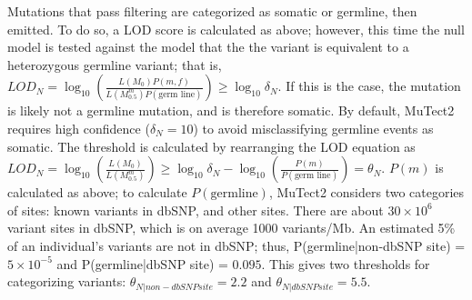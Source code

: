 Mutations that pass filtering are categorized as somatic or germline, then emitted. To do so, a LOD score is calculated as above; however, this time the null model is tested against the model that the the variant is equivalent to a heterozygous germline variant; that is, $LOD_N=\log_{10} \left(\frac{L(M_0)P(m,f)}{L(M_{0.5}^m)P(\text{germ line})}\right) \geq \log_{10} \delta{}_N$. If this is the case, the mutation is likely not a germline mutation, and is therefore somatic. By default, MuTect2 requires high confidence ($\delta{}_N = 10$) to avoid misclassifying germline events as somatic.
The threshold is calculated by rearranging the LOD equation as $LOD_N = \log_{10} \left(\frac{L(M_0)}{L(M_{0.5}^m)}\right) \geq \log_{10} \delta{}_N - \log_{10} \left(\frac{P(m)}{P(\text{germ line})}\right) = \theta{}_N$. $P(m)$ is calculated as above; to calculate $P(\text{germline})$, MuTect2 considers two categories of sites: known variants in dbSNP, and other sites. There are about $30 \times 10^6$ variant sites in dbSNP, which is on average 1000 variants/Mb. An estimated 5\% of an individual's variants are not in dbSNP; thus, P(germline|non-dbSNP site) = $5 \times 10^{-5}$ and P(germline|dbSNP site) = $0.095$. This gives two thresholds for categorizing variants: $\theta{}_{N|non-dbSNP site} = 2.2$ and $\theta{}_{N|dbSNP site} = 5.5$.


